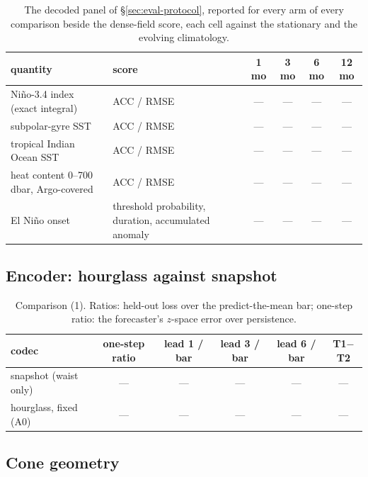 \documentclass[10pt]{article}
\newcommand{\tbd}{\textcolor{ink2}{---}}
\begin{document}
\begin{table}[H]
\centering\footnotesize\setlength{\tabcolsep}{4pt}
\begin{tabular}{@{}L{4.4cm}L{3.0cm}cccc@{}}
\toprule
quantity & score & 1 mo & 3 mo & 6 mo & 12 mo \\
\midrule
Ni\~no-3.4 index (exact integral) & ACC / RMSE & \tbd & \tbd & \tbd & \tbd \\
subpolar-gyre SST & ACC / RMSE & \tbd & \tbd & \tbd & \tbd \\
tropical Indian Ocean SST & ACC / RMSE & \tbd & \tbd & \tbd & \tbd \\
heat content 0--700\,dbar, Argo-covered & ACC / RMSE & \tbd & \tbd & \tbd & \tbd \\
El Ni\~no onset & threshold probability, duration, accumulated anomaly & \tbd & \tbd & \tbd & \tbd \\
\bottomrule
\end{tabular}
\caption{The decoded panel of \S\ref{sec:eval-protocol}, reported for every
arm of every comparison beside the dense-field score, each cell against the
stationary and the evolving climatology.\label{tab:res-panel}}
\end{table}

\subsection{Encoder: hourglass against snapshot}

\begin{table}[H]
\centering\footnotesize
\begin{tabular}{@{}L{4.2cm}ccccc@{}}
\toprule
codec & one-step ratio & lead 1 / bar & lead 3 / bar & lead 6 / bar & T1$-$T2 \\
\midrule
snapshot (waist only) & \tbd & \tbd & \tbd & \tbd & --- \\
hourglass, fixed (A0) & \tbd & \tbd & \tbd & \tbd & \tbd \\
\bottomrule
\end{tabular}
\caption{Comparison (1). Ratios: held-out loss over the predict-the-mean
bar; one-step ratio: the forecaster's $z$-space error over
persistence.\label{tab:res-codec}}
\end{table}

\subsection{Cone geometry}
\end{document}
